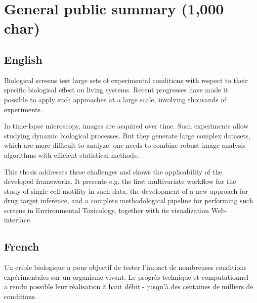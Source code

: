 \documentclass[12pt]{article}
\begin{document}
\section{General public summary (1,000 char)}
\subsection{English}
%
%
%

Biological screens test large sets of experimental conditions with
respect to their specific biological effect on living systems. Recent
progresses have made it possible to apply such approaches at a large
scale, involving thousands of experiments. 

In time-lapse microscopy, images are acquired over time. Such
experiments allow studying dynamic biological processes. But they
generate large complex datasets, which are more difficult to analyze:
one needs to combine robust image analysis algorithms with efficient
statistical methods.  

This thesis addresses these challenges and shows the applicability of
the developed frameworks. It presents e.g. the first multivariate
workflow for the study of single cell motility in such data, the
development of a new approach for drug target inference, and a
complete methodological pipeline for performing such screens in
Environmental Toxicology, together with its visualization
Web-interface. 

\subsection{French}
Un crible biologique a pour objectif de tester l'impact de nombreuses conditions expérimentales sur un organisme vivant. Le progrès technique et computationnel a rendu possible leur réalisation à haut débit - jusqu'à des centaines de milliers de conditions.
\end{document}
